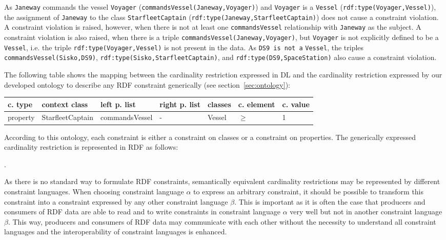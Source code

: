 \documentclass{llncs}
\newcommand{\ms}[1]{\texttt{#1}}
\newenvironment{gcotable}{
  \scriptsize
  \sffamily
  \vspace{0cm}
	\begin{center}
  \begin{tabular}{l|l|l|l|l|l|l}
  \hline
  \textbf{c. type} & \textbf{context class} & \textbf{left p. list} & \textbf{right p. list} & \textbf{classes} & \textbf{c. element} & \textbf{c. value} \\
  \hline

}{
  \hline
  \end{tabular}
	\end{center}
}
\begin{document}
As \ms{Janeway} commands the vessel \ms{Voyager} (\ms{commandsVessel(Janeway,Voyager)}) and \ms{Voyager} is a \ms{Vessel} (\ms{rdf:type(Voyager,Vessel)}), the assignment of \ms{Janeway} to the class \ms{StarfleetCaptain} (\ms{rdf:type(Janeway,StarfleetCaptain)}) does not cause a constraint violation.
A constraint violation is raised, however, when there is not at least one \ms{commandsVessel} relationship with \ms{Janeway} as the subject. 
A constraint violation is also raised, when there is a triple \ms{commandsVessel(Janeway,Voyager)}, but \ms{Voyager} is not explicitly defined to be a \ms{Vessel}, 
i.e. the triple \ms{rdf:type(Voyager,Vessel)} is not present in the data. 
As \ms{DS9 is not a} \ms{Vessel}, 
the triples \ms{commandsVessel(Sisko,DS9)}, \ms{rdf:type(Sisko,StarfleetCaptain)}, and \ms{rdf:type(DS9,SpaceStation)}  
also cause a constraint violation. 

The following table shows the mapping between the cardinality restriction expressed in DL 
and the cardinality restriction expressed by our developed ontology to describe any RDF constraint generically (see section~\ref{sec:ontology}):

\begin{gcotable}
property & StarfleetCaptain & commandsVessel & - & Vessel & $\geq$ & 1 \\
\end{gcotable}

According to this ontology, each constraint is either a constraint on classes or a constraint on properties.
The generically expressed cardinality restriction is represented in RDF as follows:

\begin{ex}
[   a PropertyConstraint ;
    contextClass StarfleetCaptain ;
    leftProperties ( commandsVessel ) ;
    classes ( Vessel ) ;
    constrainingElement ">=" ;
    constrainingValue 1 ] .
\end{ex}

As there is no standard way to formulate RDF constraints, 
semantically equivalent cardinality restrictions may be represented by different constraint languages. 
When choosing constraint language \ms{$\alpha$} to express an arbitrary constraint, it should be possible to transform this constraint into a constraint expressed by any other constraint language \ms{$\beta$}. 
This is important as it is often the case that producers and consumers of RDF data are able to read and to write constraints in constraint language \ms{$\alpha$} very well but not in another constraint language \ms{$\beta$}. 
This way, producers and consumers of RDF data may communicate with each other without the necessity to understand all constraint languages and the interoperability of constraint languages is enhanced.
\end{document}
